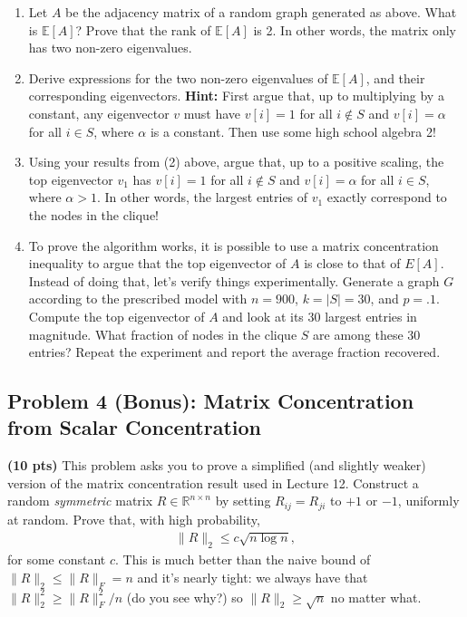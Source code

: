 \documentclass[10pt]{article}
\newcommand{\R}{\mathbb{R}}
\newcommand{\E}{\mathbb{E}}
\begin{document}
\begin{enumerate}
	\item Let $A$ be the adjacency matrix of a random graph generated as above. What is $\E[A]$? Prove that the rank of $\E[A]$ is 2. In other words, the matrix only has two non-zero eigenvalues.
	\item Derive expressions for the two non-zero eigenvalues of $\E[A]$, and their corresponding eigenvectors. \textbf{Hint:} First argue that, up to multiplying by a constant, any eigenvector $v$ must have $v[i] = 1$ for all $i \notin S$ and $v[i] = \alpha$ for all $i\in S$, where $\alpha$ is a constant. Then use some high school algebra 2!
	\item Using your results from (2) above, argue that, up to a positive scaling, the top eigenvector $v_1$ has $v[i] = 1$ for all $i \notin S$ and $v[i] = \alpha$ for all $i\in S$, where $\alpha > 1$. In other words, the largest entries of $v_1$ exactly correspond to the nodes in the clique!
	\item To prove the algorithm works, it is possible to use a matrix concentration inequality to argue that the top eigenvector of $A$ is close to that of $E[A]$. Instead of doing that, let's verify things experimentally. Generate a graph $G$ according to the prescribed model with $n = 900$, $k = 
	|S|= 30$, and $p = .1$. Compute the top eigenvector of $A$ and look at its 30 largest
	entries in magnitude. What fraction of nodes in the clique $S$ are among these 30 entries? Repeat the experiment and report the average fraction recovered. 
\end{enumerate}


\subsection{Problem 4 (Bonus): Matrix Concentration from Scalar Concentration}
\textbf{(10 pts)}   This problem asks you to prove a simplified (and slightly weaker) version of the matrix concentration result used in Lecture 12. 
Construct a random \emph{symmetric} matrix $R \in \R^{n\times n}$ by setting $R_{ij} = R_{ji}$ to $+1$ or $-1$, uniformly at random. Prove that, with high probability,
\begin{align*}
	\|R\|_2 \leq c\sqrt{n\log n},
\end{align*}
for some constant $c$. This is much better than the naive bound of $\|R\|_2 \leq \|R\|_F = n$ and it's nearly tight: we always have that $\|R\|_2^2 \geq \|R\|_F^2/n$ (do you see why?) so $\|R\|_2 \geq \sqrt{n}$ no matter what. 
\end{document}
